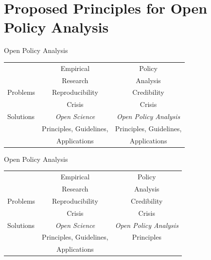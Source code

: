 \documentclass{beamer}
\def\white{\color{white}}
\begin{document}
\section[Open PA]{Proposed Principles for Open Policy Analysis}


\begin{frame}{Open Policy Analysis}
\begin{table}[ht]
\centering
\begin{tabular}[t]{|l|c|c|}
\hline
& Empirical  & Policy \\
& Research & Analysis \\

\hline
Problems & Reproducibility  &  Credibility \\
				 &  Crisis & Crisis \\
\hline
Solutions &  \textit{Open Science }&    {\white \textit{Open Policy Analysis } }\\
 & Principles, Guidelines,  &   {\white Principles, Guidelines,}\\
 & Applications &   {\white Applications}\\

\hline
\end{tabular}
\end{table}%
\end{frame}

\begin{frame}[noframenumbering]{Open Policy Analysis}
\begin{table}[ht]
\centering
\begin{tabular}[t]{|l|c|c|}
\hline
& Empirical  & Policy \\
& Research & Analysis \\

\hline
Problems & Reproducibility  &  Credibility \\
				 &  Crisis & Crisis \\
\hline
Solutions &  \textit{Open Science }&    \textit{Open Policy Analysis } \\
 & Principles, Guidelines,  &   Principles\\
 & Applications &   \\

\hline
\end{tabular}
\end{table}%
\end{frame}
\end{document}
